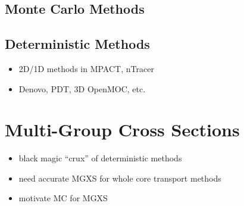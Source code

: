 \subsection{Monte Carlo Methods}
\label{subsec:chap1-monte-carlo}


\subsection{Deterministic Methods}
\label{subsec:chap1-deterministic}

\begin{itemize}
  \item 2D/1D methods in MPACT, nTracer
  \item Denovo, PDT, 3D OpenMOC, etc.
\end{itemize}


\section{Multi-Group Cross Sections}
\label{sec:chap1-mgxs}

\begin{itemize}[noitemsep]
  \item black magic ``crux'' of deterministic methods
  \item need accurate \ac{MGXS} for whole core transport methods
  \item motivate \ac{MC} for \ac{MGXS}
\end{itemize}